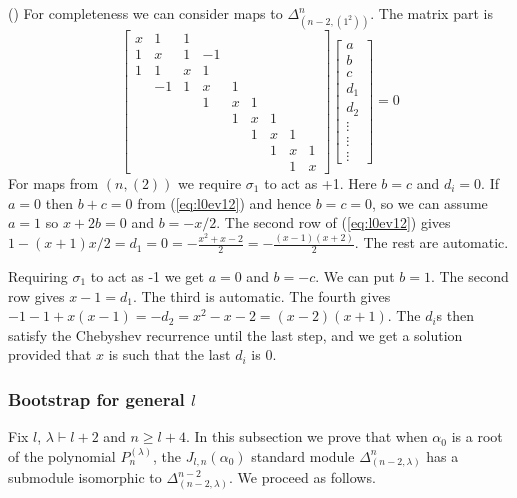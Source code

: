 \documentclass{article}
\newcommand{\ppm}[1]{\textcolor{red}{#1}}
\theoremstyle{definition}
\newcommand{\beq}{\begin{equation}}
\newcommand{\eq}{\end{equation}}
\newcommand{\ignore}[1]{}
\newcommand{\mdef}{\refstepcounter{theorem}       \medskip \noindent ({\bf \thetheorem}) }
\def\a{\alpha}
\def\l{\lambda}
\numberwithin{equation}{subsection}
\begin{document}
\mdef For completeness we can consider maps to $\Delta^{n}_{(n-2,(1^2))}$. 
The matrix part is 
\beq \label{eq:l0ev12}
\begin{bmatrix}
   x&1& 1 \\ 1&x&1 &-1 \\ 1&1&x&1 \\ &-1 &1&x&1 \\ &&& 1&x&1 \\ &&&& 1&x&1 \\  &&&&& 1&x&1 \\ &&&&&& 1&x&1 \\ &&&&&&&1&x
\end{bmatrix}
\begin{bmatrix}
    a \\ b \\ c \\ d_1 \\ d_2 \\ \vdots \\ \vdots \\ \vdots
\end{bmatrix}
=0
\eq 
For maps from $(n,(2))$ we require $\sigma_1$ to act as +1. 
Here $b=c$ and $d_i = 0$. 
If $a=0$ then $b+c=0$ from (\ref{eq:l0ev12}) and hence $b=c=0$, so we can assume 
$a=1$ so $x+2b=0$ and $b=-x/2$. 
The second row of  (\ref{eq:l0ev12}) gives 
$1-(x+1)x/2 =d_1 = 0 = -\frac{x^2 +x-2}{2} =-\frac{(x-1)(x+2)}{2}$. 
The rest are automatic. 

Requiring $\sigma_1$ to act as -1 we get $a=0$ and $b=-c$. 
We can put $b=1$.
The second row gives $x-1 = d_1$. The third is automatic. 
The fourth gives $-1-1+x(x-1) =-d_2 = x^2 -x -2 = (x-2)(x+1)$. 
The $d_i$s then satisfy the Chebyshev recurrence until the last step, and we get a solution provided that
$x$ is such that the last $d_i$ is 0.

\subsubsection{Bootstrap for \ignore{$l=1$ and}general $l$}   \label{ss:keybootl1}
Fix $l$, $\l\vdash l+2$ and $n\geq l+4$. In this subsection we prove that when $\a_0$ is a root of the polynomial $P_{n}^{(\l)}$, the $J_{l,n}(\a_0)$ standard module $\Delta^{n}_{(n-2,\l)}$ has a submodule isomorphic to $\Delta^{n-2}_{(n-2,\l)}$. We proceed as follows.
\end{document}
